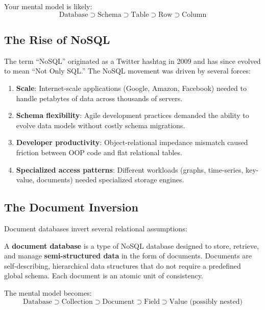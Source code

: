 \documentclass[12pt,a4paper]{article}
\begin{document}
Your mental model is likely:
\begin{equation}
\text{Database} \supset \text{Schema} \supset \text{Table} \supset \text{Row} \supset \text{Column}
\end{equation}

\subsection{The Rise of NoSQL}

The term ``NoSQL'' originated as a Twitter hashtag in 2009 and has since evolved to mean ``Not Only SQL.'' The NoSQL movement was driven by several forces:

\begin{enumerate}[noitemsep]
    \item \textbf{Scale}: Internet-scale applications (Google, Amazon, Facebook) needed to handle petabytes of data across thousands of servers.
    \item \textbf{Schema flexibility}: Agile development practices demanded the ability to evolve data models without costly schema migrations.
    \item \textbf{Developer productivity}: Object-relational impedance mismatch caused friction between OOP code and flat relational tables.
    \item \textbf{Specialized access patterns}: Different workloads (graphs, time-series, key-value, documents) needed specialized storage engines.
\end{enumerate}

\subsection{The Document Inversion}

Document databases invert several relational assumptions:

\begin{definition}
A \textbf{document database} is a type of NoSQL database designed to store, retrieve, and manage \textbf{semi-structured data} in the form of documents. Documents are self-describing, hierarchical data structures that do not require a predefined global schema. Each document is an atomic unit of consistency.
\end{definition}

The mental model becomes:
\begin{equation}
\text{Database} \supset \text{Collection} \supset \text{Document} \supset \text{Field} \supset \text{Value (possibly nested)}
\end{equation}
\end{document}

